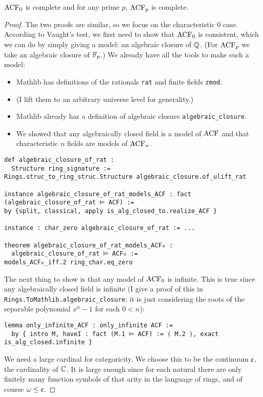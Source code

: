 \begin{prop}
  $\operatorname{ACF}_{0}$ is complete and for any prime $p$, $\operatorname{ACF}_{p}$ is complete.
\end{prop}
\begin{proof}
  The two proofs are similar, so we focus on the characteristic $0$ case.
  According to Vaught's test, we first need to show that $\operatorname{ACF}_{0}$ is consistent,
  which we can do by simply giving a model: an algebraic closure of $\mathbb{Q}$.
  (For $\operatorname{ACF}_{p}$ we take an algebraic closure of $\mathbb{F}_{p}$.)
  We already have all the tools to make such a model:
  \begin{itemize}
    \item Mathlib has definitions of the rationals \texttt{rat} and finite fields \texttt{zmod}.
    \item (I lift them to an arbitrary universe level for generality.)
    \item Mathlib already has a definition of algebraic closure \texttt{algebraic\_closure}.
    \item We showed that any algebraically closed field is a model of $\operatorname{ACF}$
          and that characteristic $n$ fields are models of $\operatorname{ACF}_{n}$.
  \end{itemize}
  \begin{lstlisting}
def algebraic_closure_of_rat :
  Structure ring_signature :=
Rings.struc_to_ring_struc.Structure algebraic_closure.of_ulift_rat

instance algebraic_closure_of_rat_models_ACF : fact (algebraic_closure_of_rat ⊨ ACF) :=
by {split, classical, apply is_alg_closed_to.realize_ACF }

instance : char_zero algebraic_closure_of_rat := ...

theorem algebraic_closure_of_rat_models_ACF₀ :
  algebraic_closure_of_rat ⊨ ACF₀ :=
models_ACF₀_iff.2 ring_char.eq_zero \end{lstlisting}

The next thing to show is that any model of $\operatorname{ACF}_{0}$ is infinite.
This is true since any algebraically closed field is infinite
(I give a proof of this in \texttt{Rings.ToMathlib.algebraic\_closure};
it is just considering the roots of the separable polynomial $x^{n} - 1$ for each $0 < n$):
\begin{lstlisting}
lemma only_infinite_ACF : only_infinite ACF :=
  by { intro M, haveI : fact (M.1 ⊨ ACF) := ⟨ M.2 ⟩, exact is_alg_closed.infinite }\end{lstlisting}

We need a large cardinal for categoricity.
We choose this to be the continuum $\mathfrak{c}$, the cardinality of $\mathbb{C}$.
It is large enough since for each natural there are only finitely many function symbols
of that arity in the language of rings, and of course $\omega \le \mathfrak{c}$.


\end{proof}
